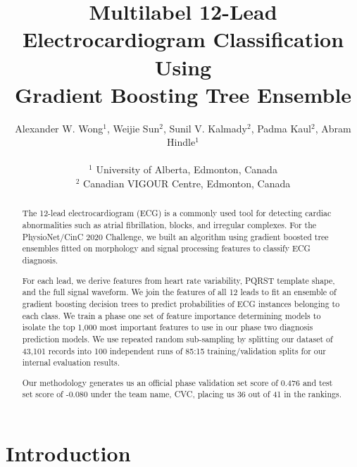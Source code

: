 \documentclass[twocolumn]{cinc}
\begin{document}


\title{Multilabel 12-Lead Electrocardiogram Classification Using \\
Gradient Boosting Tree Ensemble}

\author {Alexander W. Wong$^{1}$, Weijie Sun$^{2}$, Sunil V. Kalmady$^{2}$, Padma Kaul$^{2}$, Abram Hindle$^{1}$\\
\ \\
 $^1$ University of Alberta, Edmonton, Canada \\
$^2$ Canadian VIGOUR Centre, Edmonton, Canada }

\maketitle

\newcommand{\officialvalscore}{{0.476} }
\newcommand{\officialtestscore}{{-0.080} }

\begin{abstract}

The 12-lead electrocardiogram (ECG) is a commonly used tool for detecting cardiac abnormalities such as atrial fibrillation, blocks, and irregular complexes.
For the PhysioNet/CinC 2020 Challenge, we built an algorithm using gradient boosted tree ensembles fitted on morphology and signal processing features to classify ECG diagnosis.

For each lead, we derive features from heart rate variability, PQRST template shape, and the full signal waveform.
We join the features of all 12 leads to fit an ensemble of gradient boosting decision trees to predict probabilities of ECG instances belonging to each class.
We train a phase one set of feature importance determining models to isolate the top 1,000 most important features to use in our phase two diagnosis prediction models.
We use repeated random sub-sampling by splitting our dataset of 43,101 records into 100 independent runs of 85:15 training/validation splits for our internal evaluation results.

Our methodology generates us an official phase validation set score of \officialvalscore and test set score of \officialtestscore under the team name, CVC, placing us 36 out of 41 in the rankings.

\end{abstract}

\section{Introduction}
\end{document}
